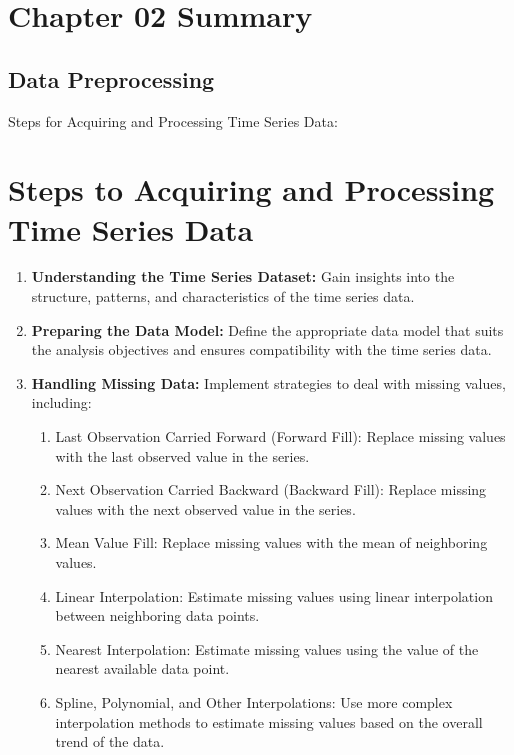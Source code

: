 \documentclass{article}
\begin{document}
\section{Chapter 02 Summary}

\subsection{Data Preprocessing}
Steps for Acquiring and Processing Time Series Data:

\section*{Steps to Acquiring and Processing Time Series Data}

\begin{enumerate}
    \item \textbf{Understanding the Time Series Dataset:} Gain insights into the structure, patterns, and characteristics of the time series data.
    
    \item \textbf{Preparing the Data Model:} Define the appropriate data model that suits the analysis objectives and ensures compatibility with the time series data.
    
    \item \textbf{Handling Missing Data:} Implement strategies to deal with missing values, including:
    \begin{enumerate}
        \item  {Last Observation Carried Forward (Forward Fill):} Replace missing values with the last observed value in the series.
        \item  {Next Observation Carried Backward (Backward Fill):} Replace missing values with the next observed value in the series.
        \item  {Mean Value Fill:} Replace missing values with the mean of neighboring values.
        \item  {Linear Interpolation:} Estimate missing values using linear interpolation between neighboring data points.
        \item  {Nearest Interpolation:} Estimate missing values using the value of the nearest available data point.
        \item  {Spline, Polynomial, and Other Interpolations:} Use more complex interpolation methods to estimate missing values based on the overall trend of the data.
    \end{enumerate}


\end{enumerate}
\end{document}
